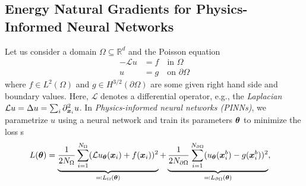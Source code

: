 \subsection{Energy Natural Gradients for Physics-Informed Neural Networks}
Let us consider a domain $\Omega\subseteq\mathbb R^d$ and the Poisson equation %
\begin{align*}\tag{PE}\label{eq:PE}
  -\mathcal{L} u & = f \quad \text{in }\Omega \\
  u & = g \quad \text{on }\partial\Omega
\end{align*}
where $f\in L^2(\Omega)$ and $g\in H^{3/2}(\partial\Omega)$ are some given right hand side and boundary values.
Here, $\mathcal{L}$ denotes a differential operator, e.g., the \emph{Laplacian} $\mathcal{L} u = \Delta u = \sum_i \partial_{{\bm{x}}_i}^2 u$.
In \emph{Physics-informed neural networks (PINNs)}, we parametrize $u$ using a neural network and train its parameters ${\bm{\theta}}$ to minimize the loss s
\begin{align}\label{eq:pinn-loss}
  L({\bm{\theta}})
  &=
    \underbrace{\frac{1}{2N_\Omega} \sum_{i=1}^{N_\Omega} (\mathcal{L} u_{\bm{\theta}}({\bm{x}}_i) + f({\bm{x}}_i))^2}_{\eqqcolon L_\Omega({\bm{\theta}})} + \underbrace{\frac{1}{2N_{\partial\Omega}}\sum_{i=1}^{N_{\partial\Omega}} ( u_{\bm{\theta}}({\bm{x}}^b_i) - g({\bm{x}}^b_i))^2}_{\eqqcolon L_{\partial\Omega}({\bm{\theta}})},
\end{align}
